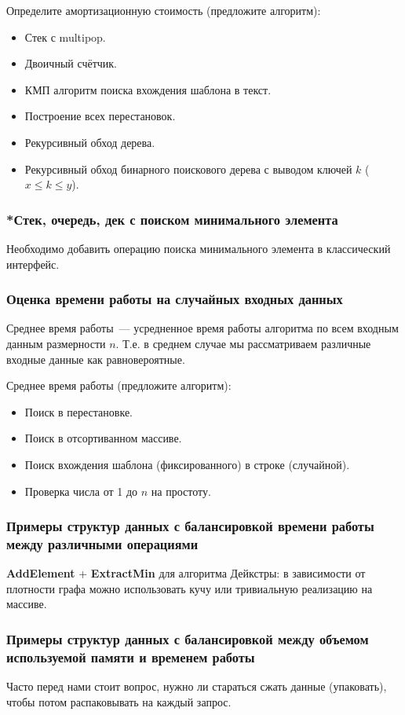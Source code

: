 Определите амортизационную стоимость (предложите алгоритм):
\begin{itemize}
    \item Стек с multipop.
    \item Двоичный счётчик.
    \item КМП алгоритм поиска вхождения шаблона в текст.
    \item Построение всех перестановок.
    \item Рекурсивный обход дерева.
    \item Рекурсивный обход бинарного поискового дерева с выводом ключей $k$ ($x \le k \le y$).
\end{itemize}

\subsubsection*{*Стек, очередь, дек с поиском минимального элемента}
Необходимо добавить операцию поиска минимального элемента в классический интерфейс.

\subsubsection*{Оценка времени работы на случайных входных данных}
Среднее время работы~--- усредненное время работы алгоритма по всем входным данным размерности $n$.
Т.е. в среднем случае мы рассматриваем различные входные данные как равновероятные.

Среднее время работы (предложите алгоритм):
\begin{itemize}
    \item Поиск в перестановке.
    \item Поиск в отсортиванном массиве.
    \item Поиск вхождения шаблона (фиксированного) в строке (случайной).
    \item Проверка числа от 1 до $n$ на простоту.
\end{itemize}

\subsubsection*{Примеры структур данных с балансировкой времени работы между различными операциями}
\textbf{AddElement} + \textbf{ExtractMin} для алгоритма Дейкстры: в зависимости от плотности графа можно использовать
кучу или тривиальную реализацию на массиве.

\subsubsection*{Примеры структур данных с балансировкой между объемом используемой памяти и временем работы}
Часто перед нами стоит вопрос, нужно ли стараться сжать данные (упаковать), чтобы потом распаковывать на каждый запрос.
